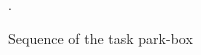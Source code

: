 \begin{figure}[H]
   \hfill
  \caption{Sequence of the task park-box}.
  \label{fig:sequence-park-box}
\end{figure}



